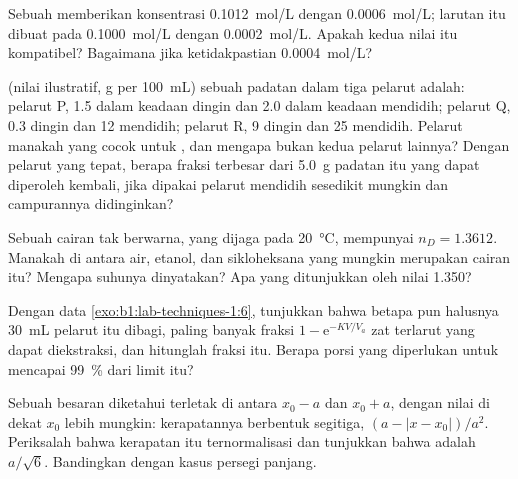 \begin{exercise}[$\star\star$]\label{exo:b1:lab-techniques-1:7}
Sebuah  memberikan konsentrasi \qty{0.1012}{mol/L} dengan
 \qty{0.0006}{mol/L}; larutan itu dibuat pada
\qty{0.1000}{mol/L} dengan  \qty{0.0002}{mol/L}.
Apakah kedua nilai itu kompatibel? Bagaimana jika ketidakpastian
 \qty{0.0004}{mol/L}?
\end{exercise}

\begin{exercise}[$\star\star$]\label{exo:b1:lab-techniques-1:8}
 (nilai ilustratif, \unit{g} per \qty{100}{mL}) sebuah padatan
dalam tiga pelarut adalah: pelarut P, 1.5 dalam keadaan dingin dan 2.0
dalam keadaan mendidih; pelarut Q, 0.3 dingin dan 12 mendidih; pelarut R,
9 dingin dan 25 mendidih. Pelarut manakah yang cocok untuk ,
dan mengapa bukan kedua pelarut lainnya? Dengan pelarut yang tepat,
berapa fraksi terbesar dari \qty{5.0}{g} padatan itu yang dapat diperoleh
kembali, jika dipakai pelarut mendidih sesedikit mungkin dan campurannya
didinginkan?
\end{exercise}

\begin{exercise}[$\star\star$]\label{exo:b1:lab-techniques-1:9}
Sebuah cairan tak berwarna, yang dijaga pada \qty{20}{\celsius}, mempunyai
$n_D = 1.3612$. Manakah di antara air, etanol, dan sikloheksana yang
mungkin merupakan cairan itu? Mengapa suhunya dinyatakan? Apa yang
ditunjukkan oleh nilai 1.350?
\end{exercise}

\begin{exercise}[$\star\star\star$]\label{exo:b1:lab-techniques-1:10}
Dengan data \cref{exo:b1:lab-techniques-1:6}, tunjukkan bahwa betapa pun
halusnya \qty{30}{mL} pelarut itu dibagi, paling banyak fraksi
$1 - \mathrm{e}^{-KV/V_a}$ zat terlarut yang dapat diekstraksi, dan
hitunglah fraksi itu. Berapa porsi yang diperlukan untuk mencapai
\qty{99}{\percent} dari limit itu?
\end{exercise}

\begin{exercise}[$\star\star\star$]\label{exo:b1:lab-techniques-1:11}
Sebuah besaran diketahui terletak di antara $x_0 - a$ dan $x_0 + a$,
dengan nilai di dekat
$x_0$ lebih mungkin: kerapatannya berbentuk segitiga, $(a - |x - x_0|)/a^2$.
Periksalah bahwa kerapatan itu ternormalisasi dan tunjukkan bahwa
 adalah
$a/\sqrt6$. Bandingkan dengan kasus persegi panjang.
\end{exercise}


